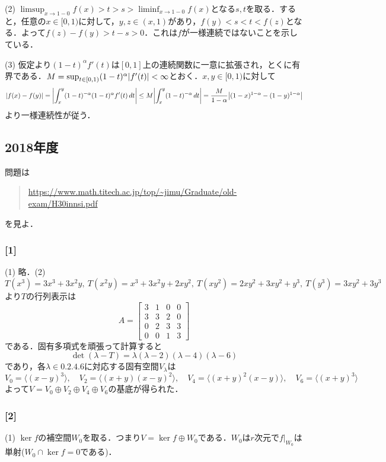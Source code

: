 \documentclass[a4j]{ltjsarticle}
\newcommand{\1}{\mathbbm{1}}
\numberwithin{equation}{section}
\theoremstyle{definition}
\begin{document}
(2) $\limsup_{x\to 1-0}f(x)>t>s>\liminf_{x\to1-0}f(x)$となる$s,t$を取る．すると，任意の$x\in[0,1)$に対して，$y,z\in(x,1)$があり，$f(y)<s<t<f(z)$となる．よって$f(z)-f(y)>t-s>0$．これは$f$が一様連続ではないことを示している．

(3) 仮定より$(1-t)^\alpha f'(t)$は$[0,1]$上の連続関数に一意に拡張され，とくに有界である．$M=\sup_{t\in [0,1)}(1-t)^\alpha \abs{f'(t)}<\infty$とおく．$x,y\in [0,1)$に対して
\begin{equation}
    \abs{f(x)-f(y)}=\abs{\int_{x}^{y} (1-t)^{-\alpha}(1-t)^\alpha f'(t)\,dt}\leq M\abs{\int_{x}^{y}(1-t)^{-\alpha}\,dt}=\frac{M}{1-\alpha}\abs{(1-x)^{1-\alpha}-(1-y)^{1-\alpha}} 
\end{equation}
より一様連続性が従う．
\subsection{2018年度}
問題は
\begin{quote}
    \url{https://www.math.titech.ac.jp/top/~jimu/Graduate/old-exam/H30innsi.pdf}
\end{quote}
を見よ．
\subsubsection*{[1]}
(1) 略．(2) $T(x^3)=3x^3+3x^2y,\ T(x^2y)=x^3+3x^2y+2xy^2,\ T(xy^2)=2xy^2+3xy^2+y^3,\ T(y^3)=3xy^2+3y^3$より$T$の行列表示は
\begin{equation}
    A=\begin{bmatrix}
        3 & 1 & 0 & 0 \\
        3 & 3 & 2 & 0 \\
        0 & 2 & 3 & 3 \\
        0 & 0 & 1 & 3 
    \end{bmatrix}
\end{equation}
である．固有多項式を頑張って計算すると
\begin{equation}
    \det(\lambda - T)=\lambda(\lambda-2)(\lambda-4)(\lambda-6)
\end{equation}
であり，各$\lambda\in\qty{0,2,4,6}$に対応する固有空間$V_{\lambda}$は
\begin{equation}
    V_{0}=\langle(x-y)^3\rangle,\quad V_{2}=\langle (x+y)(x-y)^2\rangle,\quad V_{4}=\langle (x+y)^2(x-y)\rangle,\quad V_{6}=\langle(x+y)^3\rangle
\end{equation}
よって$V=V_{0}\oplus V_{2}\oplus V_{4}\oplus V_{6}$の基底が得られた．
\subsubsection*{[2]}
(1) $\ker f$の補空間$W_{0}$を取る．つまり$V=\ker f\oplus W_{0}$である．$W_{0}$は$r$次元で$f|_{W_{0}}$は単射($W_{0}\cap \ker f=0$である)．
\end{document}
